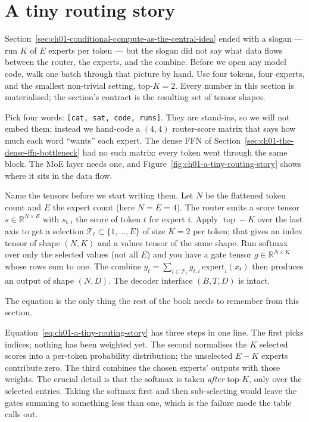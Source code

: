 \section{A tiny routing story}
\label{sec:ch01-a-tiny-routing-story}

Section~\ref{sec:ch01-conditional-compute-as-the-central-idea} ended with a slogan --- run $K$ of $E$ experts per token --- but the slogan did not say what data flows between the router, the experts, and the combine. Before we open any model code, walk one batch through that picture by hand. Use four tokens, four experts, and the smallest non-trivial setting, top-$K = 2$. Every number in this section is materialised; the section's contract is the resulting set of tensor shapes.



Pick four words: \texttt{[cat, sat, code, runs]}. They are stand-ins, so we will not embed them; instead we hand-code a $(4, 4)$ router-score matrix that says how much each word ``wants'' each expert. The dense FFN of Section~\ref{sec:ch01-the-dense-ffn-bottleneck} had no such matrix: every token went through the same block. The MoE layer needs one, and Figure~\ref{fig:ch01-a-tiny-routing-story} shows where it sits in the data flow.

Name the tensors before we start writing them. Let $N$ be the flattened token count and $E$ the expert count (here $N = E = 4$). The router emits a score tensor $s \in \mathbb{R}^{N \times E}$ with $s_{t,i}$ the score of token $t$ for expert $i$. Apply $\operatorname{top}{-}K$ over the last axis to get a selection $\mathcal{T}_t \subset \{1, \dots, E\}$ of size $K = 2$ per token; that gives an index tensor of shape $(N, K)$ and a values tensor of the same shape. Run softmax over only the selected values (not all $E$) and you have a gate tensor $g \in \mathbb{R}^{N \times K}$ whose rows sum to one. The combine $y_t = \sum_{i \in \mathcal{T}_t} g_{t,i} \, \mathrm{expert}_i(x_t)$ then produces an output of shape $(N, D)$. The decoder interface $(B, T, D)$ is intact.



The equation is the only thing the rest of the book needs to remember from this section.



Equation~\ref{eq:ch01-a-tiny-routing-story} has three steps in one line. The first picks indices; nothing has been weighted yet. The second normalises the $K$ selected scores into a per-token probability distribution; the unselected $E - K$ experts contribute zero. The third combines the chosen experts' outputs with those weights. The crucial detail is that the softmax is taken \emph{after} top-$K$, only over the selected entries. Taking the softmax first and then sub-selecting would leave the gates summing to something less than one, which is the failure mode the table calls out.

